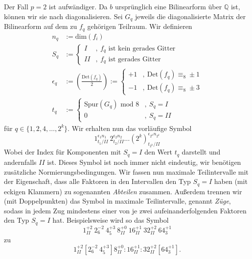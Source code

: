\documentclass[12pt,a4paper,halfparskip,headsepline,bibtotocnumbered]{scrreprt}
\theoremstyle{nummermitklammern}
\theoremstyle{nonumberbreak}
\newcommand{\Q}{\mathbb{Q}}
\newcommand{\Det}{\text{Det}}
\begin{document}
Der Fall $p=2$ ist aufwändiger. Da $b$ ursprünglich eine Bilinearform über $\Q$ ist, können wir sie nach \cite[Satz (1.20)]{kneser} diagonalisieren. Sei $G_q$ jeweils die diagonalisierte Matrix der Bilinearform auf dem zu $f_q$ gehörigen Teilraum. Wir definieren
\begin{align*}
	n_q &:= \text{dim}(f_i)\\
	S_q &:= \begin{cases} I&,\ f_q \text{ ist kein gerades Gitter}\\ II &,\ f_q \text{ ist gerades Gitter} \end{cases}\\
	\epsilon_q &:= \left( \frac{\Det(f_q)}{2} \right) := \begin{cases} +1 &,\ \Det(f_q) \equiv_8 \pm 1\\ -1 &,\ \Det(f_q) \equiv_8 \pm 3 \end{cases}\\
	t_q &:= \begin{cases} \text{Spur}(G_q) \text{ mod } 8 &,\ S_q = I\\ 0 &,\ S_q = II\end{cases}
\end{align*}
für $q \in \lbrace 1, 2, 4, \dots, 2^k \rbrace$. Wir erhalten nun das vorläufige Symbol
\begin{equation*}
	1_{t_1 / II}^{\epsilon_1 n_1}\ 2_{t_2 / II}^{\epsilon_2 n_2} \dots \left( 2^k \right)_{t_{2^k} / II}^{\epsilon_{2^k} n_{2^k}}
\end{equation*}
Wobei der Index für Komponenten mit $S_q = I$ den Wert $t_q$ darstellt und andernfalls $II$ ist. Dieses Symbol ist noch immer nicht eindeutig, wir benötigen zusätzliche Normierungsbedingungen. Wir fassen nun maximale Teilintervalle mit der Eigenschaft, dass alle Faktoren in den Intervallen den Typ $S_q = I$ haben (mit eckigen Klammern) zu sogenannten \textit{Abteilen} zusammen. Außerdem trennen wir (mit Doppelpunkten) das Symbol in maximale Teilintervalle, genannt \textit{Züge}, sodass in jedem Zug mindestens einer von je zwei aufeinanderfolgenden Faktoren den Typ $S_q = I$ hat. Beispielsweise wird so das Symbol
\begin{equation}\label{symbol}
	1_{II}^{+2}\ 2_6^{-2}\ 4_5^{+3}\ 8_{II}^{+0}\ 16_{II}^{+1}\ 32_{II}^{+2}\ 64_{3}^{+1}
\end{equation}
zu
\begin{equation*}
	1_{II}^{+2} \left[ 2_6^{-2}\ 4_5^{+3} \right] 8_{II}^{+0} : 16_{II}^{+1} : 32_{II}^{+2} \left[ 64_{3}^{+1} \right].
\end{equation*}
\end{document}
